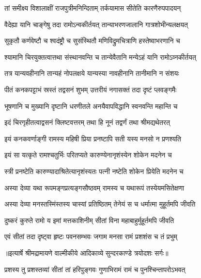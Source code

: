 \twolineshloka
{तां समीक्ष्य विशालाक्षीं राजपुत्रीमनिन्दिताम्}
{तर्कयामास सीतेति कारणैरुपपादयन्} %

\twolineshloka
{वैदेह्या यानि चाङ्गेषु तदा रामोऽन्वकीर्तयत्}
{तान्याभरणजालानि गात्रशोभीन्यलक्षयत्} %

\twolineshloka
{सुकृतौ कर्णवेष्टौ च श्वदंष्ट्रौ च सुसंस्थितौ}
{मणिविद्रुमचित्राणि हस्तेष्वाभरणानि च} %

\twolineshloka
{श्यामानि चिरयुक्तत्वात्तथा संस्थानवन्ति च}
{तान्येवैतानि मन्येऽहं यानि रामोऽव्नकीर्तयत्} %

\twolineshloka
{तत्र यान्यवहीनानि तान्यहं नोपलक्षये}
{यान्यस्या नावहीनानि तानीमानि न संशयः} %

\twolineshloka
{पीतं कनकपट्टाभं स्रस्तं तद्वसनं शुभम्}
{उत्तरीयं नगासक्तं तदा दृष्टं प्लवङ्गमैः} %

\twolineshloka
{भूषणानि च मुख्यानि दृष्टानि धरणीतले}
{अनयैवापविद्धानि स्वनवन्ति महान्ति च} %

\twolineshloka
{इदं चिरगृहीतत्वाद्वसनं क्लिष्टवत्तरम्}
{तथा हि नूनं तद्वर्णं तथा श्रीमद्यथेतरत्} %

\twolineshloka
{इयं कनकवर्णाङ्गी रामस्य महिषी प्रिया}
{प्रनष्टापि सती यस्य मनसो न प्रणश्यति} %

\twolineshloka
{इयं सा यत्कृते रामश्चतुर्भिः परितप्यते}
{कारुण्येनानृशंस्येन शोकेन मदनेन च} %

\twolineshloka
{स्त्री प्रनष्टेति कारुण्यादाश्रितेत्यानृशंस्यतः}
{पत्नी नष्टेति शोकेन प्रियेति मदनेन च} %

\twolineshloka
{अस्या देव्या यथा रूपमङ्गप्रत्यङ्गसौष्ठवम्}
{रामस्य च यथारूपं तस्येयमसितेक्षणा} %

\twolineshloka
{अस्या देव्या मनस्तस्मिंस्तस्य चास्यां प्रतिष्ठितम्}
{तेनेयं स च धर्मात्मा मुहूर्तमपि जीवति} %

\twolineshloka
{दुष्करं कुरुते रामो य इमां मत्तकाशिनीम्}
{सीतां विना महाबाहुर्मुहूर्तमपि जीवति} %

\twolineshloka
{एवं सीतां तदा दृष्ट्वा हृष्टः पवनसम्भवः}
{जगाम मनसा रामं प्रशशंस च तं प्रभुम्} %


{॥इत्यार्षे श्रीमद्रामायणे वाल्मीकीये आदिकाव्ये सुन्दरकाण्डे त्रयोदशः सर्गः॥}


\twolineshloka
{प्रशस्य तु प्रशस्तव्यां सीतां तां हरिपुङ्गवः}
{गुणाभिरामं रामं च पुनश्चिन्तापरोऽभवत्} %


